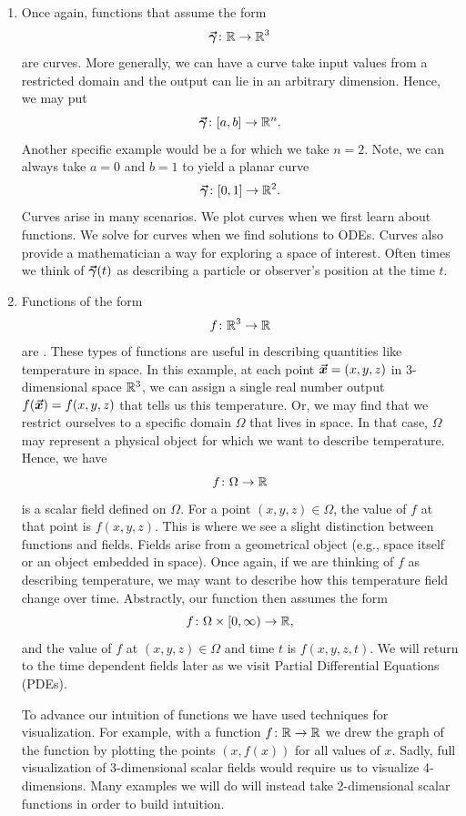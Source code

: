         \begin{enumerate}[(1)]
        \item Once again, functions that assume the form
        \[
        \boldsymbol{\vec{\gamma}} \colon \mathbb{R}\to \mathbb{R}^3
        \]
        are curves. More generally, we can have a curve take input values from a restricted domain and the output can lie in an arbitrary dimension. Hence, we may put
        \[
        \boldsymbol{\vec{\gamma}} \colon [a,b]\to \mathbb{R}^n.
        \]
        Another specific example would be a  for which we take $n=2$. Note, we can always take $a=0$ and $b=1$ to yield a planar curve 
        \[
            \boldsymbol{\vec{\gamma}} \colon [0,1] \to \mathbb{R}^2.
        \]
        Curves arise in many scenarios. We plot curves when we first learn about functions. We solve for curves when we find solutions to ODEs. Curves also provide a mathematician a way for exploring a space of interest. Often times we think of $\boldsymbol{\vec{\gamma}}(t)$ as describing a particle or observer's position at the time $t$.
        
        \item Functions of the form
        \[
        f\colon \mathbb{R}^3 \to \mathbb{R}
        \]
        are . These types of functions are useful in describing quantities like temperature in space. In this example, at each point $\boldsymbol{\boldsymbol{\vec{x}}}=(x,y,z)$ in 3-dimensional space $\mathbb{R}^3$, we can assign a single real number output $f(\boldsymbol{\boldsymbol{\vec{x}}})=f(x,y,z)$ that tells us this temperature. Or, we may find that we restrict ourselves to a specific domain $\Omega$ that lives in space. In that case, $\Omega$ may represent a physical object for which we want to describe temperature. Hence, we have
        \[
        f \colon \Omega \to \mathbb{R}
        \] 
        is a scalar field defined on $\Omega$. For a point $(x,y,z) \in \Omega$, the value of $f$ at that point is $f(x,y,z)$. This is where we see a slight distinction between functions and fields. Fields arise from a geometrical object (e.g., space itself or an object embedded in space). Once again, if we are thinking of $f$ as describing temperature, we may want to describe how this temperature field change over time. Abstractly, our function then assumes the form
        \[
        f \colon \Omega \times [0,\infty) \to \mathbb{R},
        \]
        and the value of $f$ at $(x,y,z) \in \Omega$ and time $t$ is $f(x,y,z,t)$. We will return to the time dependent fields later as we visit Partial Differential Equations (PDEs).

        To advance our intuition of functions we have used techniques for visualization. For example, with a function $f \colon \mathbb{R} \to \mathbb{R}$ we drew the graph of the function by plotting the points $(x,f(x))$ for all values of $x$. Sadly, full visualization of 3-dimensional scalar fields would require us to visualize 4-dimensions. Many examples we will do will instead take 2-dimensional scalar functions in order to build intuition.
        

\end{enumerate}
